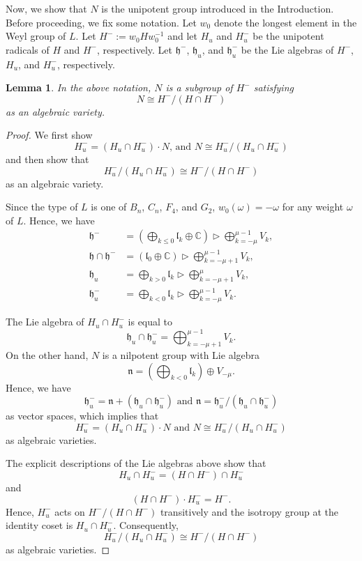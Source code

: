 \documentclass{amsart}
\newtheorem{lemma}[theorem]{Lemma}
\theoremstyle{definition}
\theoremstyle{remark}
\newcommand{\C}{\mathbb{C}}
\newcommand{\h}{\mathfrak{h}}
\newcommand{\n}{\mathfrak{n}}
\begin{document}
Now, we show that $N$ is the unipotent group introduced in the Introduction. Before proceeding, we fix some notation. Let $w_0$ denote the longest element in the Weyl group of $L$. Let $H^- := w_0Hw_0^{-1}$ and let $H_u$ and $H_u^-$ be the unipotent radicals of $H$ and $H^-$, respectively. Let $\h^-$, $\h_u$, and $\h_u^-$ be the Lie algebras of $H^-$, $H_u$, and $H_u^-$, respectively.


\begin{lemma}
\label{unipotent}
In the above notation, $N$ is a subgroup of $H^-$ satisfying
\[N \cong H^- /(H \cap H^-)\]
as an algebraic variety. 
\end{lemma}

\begin{proof}
We first show
\[H_u^- = (H_u \cap H_u^-) \cdot N \text{, and } N \cong H_u^- /(H_u \cap H_u^-)\]
and then show that
\[H_u^- /(H_u \cap H_u^-) \cong H^- /(H \cap H^-)\]
as an algebraic variety.

Since the type of $L$ is one of $B_n$, $C_n$, $F_4$, and $G_2$, $w_0(\omega) = -\omega$ for any weight $\omega$ of $L$. Hence, we have
\begin{align*}
\h^- &= (\bigoplus_{k\leq0} \mathfrak{l}_k \oplus \C) \rhd \bigoplus_{k = -\mu}^{\mu-1}V_k, \\
\h \cap \h^-  &= (\mathfrak{l}_0 \oplus \C) \rhd \bigoplus_{k = -\mu+1}^{\mu-1}V_k,\\
\h_u &= \bigoplus_{k > 0} \mathfrak{l}_k \rhd \bigoplus_{k = -\mu + 1}^{\mu}V_k,\\
\h_u^- &= \bigoplus_{k < 0} \mathfrak{l}_k \rhd \bigoplus_{k = -\mu}^{\mu-1}V_k.
\end{align*}

The Lie algebra of $H_u \cap H_u^-$ is equal to 
\[\h_u \cap \h_u^- = \bigoplus_{k=-\mu+1}^{\mu-1} V_{k}.\]
On the other hand, $N$ is a nilpotent group with Lie algebra
\[\n = (\bigoplus_{k < 0} \mathfrak{l}_k) \oplus V_{-\mu}.\]
Hence, we have 
\[\h_u^- = \n + (\h_u \cap \h_u^-) \text{ and } \n = \h_u^- / (\h_u \cap \h_u^-)\]
as vector spaces, which implies that
\[H_u^- = (H_u \cap H_u^-) \cdot N \text{ and } N\cong H_u^-/(H_u \cap H_u^-)\]
as algebraic varieties.

The explicit descriptions of the Lie algebras above show that
\[H_u \cap H_u^- = (H\cap H^-) \cap H_u^-\]
and 
\[(H \cap H^-) \cdot H_u^- = H^-.\]
Hence, $H_u^-$ acts on $H^-/(H \cap H^-)$ transitively and the isotropy group at the identity coset is $H_u \cap H_u^-$. Consequently, 
\[H_u^- /(H_u \cap H_u^-) \cong H^- /(H \cap H^-)\]
as algebraic varieties.
\end{proof}
\end{document}
